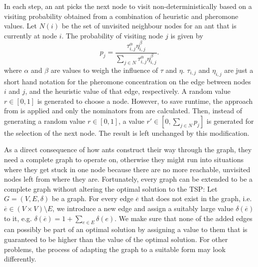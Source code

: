 
In each step, an ant picks the next node to visit non-deterministically based on a visiting probability obtained from a combination of heuristic and pheromone values. Let $N \left( i \right)$ be the set of unvisited neighbour nodes for an ant that is currently at node $i$. The probability of visiting node $j$ is given by
\begin{equation}
  \label{eqn:probability}
  p_j = \frac{\tau_{i,j}^\alpha \eta_{i,j}^\beta}{\sum_{j \in N} \tau_{i,j}^\alpha \eta_{i,j}^\beta}.
\end{equation}
where $\alpha$ and $\beta$ are values to weigh the influence of $\tau$ and $\eta$. $\tau_{i,j}$ and $\eta_{i,j}$ are just a short hand notation for the pheromone concentration on the edge between nodes $i$ and $j$, and the heuristic value of that edge, respectively. A random value $r \in \left[0, 1 \right]$ is generated to choose a node. However, to save runtime, the approach from \cite{Bloecker} is applied and only the nominators from  are calculated. Then, instead of generating a random value $r \in \left[0, 1 \right]$, a value $r' \in \left[0, \sum_{j \in N} p_j \right]$ is generated for the selection of the next node. The result is left unchanged by this modification.

As a direct consequence of how ants construct their way through the graph, they need a complete graph to operate on, otherwise they might run into situations where they get stuck in one node because there are no more reachable, unvisited nodes left from where they are. Fortunately, every graph can be extended to be a complete graph without altering the optimal solution to the \textsc{TSP}: Let $G = \left( V, E, \delta \right)$ be a graph. For every edge $\overline{e}$ that does not exist in the graph, i.e. $\overline{e} \in \left( V \times V \right) \setminus E$, we introduce a new edge and assign a suitably large value $\delta \left( \overline{e} \right)$ to it, e.g. $\delta \left( \overline{e} \right) = 1 + \sum_{e \in E} \delta \left( e \right)$. We make sure that none of the added edges can possibly be part of an optimal solution by assigning a value to them that is guaranteed to be higher than the value of the optimal solution. For other problems, the process of adapting the graph to a suitable form may look differently.


